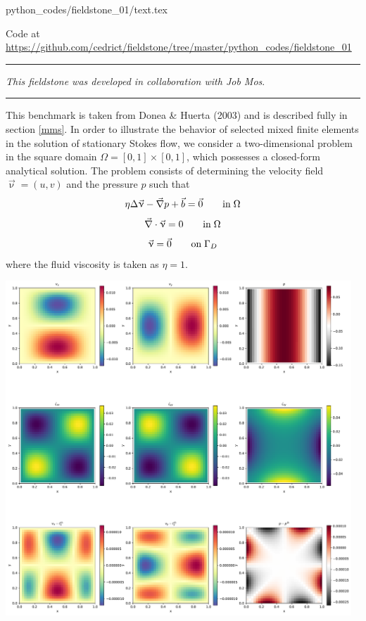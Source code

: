 \begin{flushright} {\tiny {\color{gray} python\_codes/fieldstone\_01/text.tex}} \end{flushright}



\begin{center}
Code at \url{https://github.com/cedrict/fieldstone/tree/master/python_codes/fieldstone_01}
\end{center}

\par\noindent\rule{\textwidth}{0.4pt}

{\sl This fieldstone was developed in collaboration with Job Mos}. 

\par\noindent\rule{\textwidth}{0.4pt}

This benchmark is taken from Donea \& Huerta (2003) \cite{dohu03} and is described fully in section \ref{mms}. 
In order to illustrate the behavior of selected mixed finite elements in the solution 
of stationary Stokes flow,  we consider a two-dimensional problem 
in the square domain $\Omega=[0,1]\times[0,1]$, which possesses a closed-form analytical 
solution. The problem consists of determining the velocity field $\vec{\upnu} = (u,v)$ and the 
pressure $p$ such that 
\[
\eta \Delta \vec\upnu - \vec{\nabla} p + \vec{b} = \vec{0}   \quad\quad {\rm in} \; \Omega
\]
\[
\vec{\nabla} \cdot \vec{\upnu} = 0 \quad\quad {\rm in} \; \Omega
\]
\[
\vec{\upnu}=\vec{0} \quad\quad {\rm on} \; \Gamma_D
\]
where the fluid viscosity is taken as $\eta=1$. 

\begin{center}
\includegraphics[width=13cm]{python_codes/fieldstone_01/solution.pdf}
\end{center}

